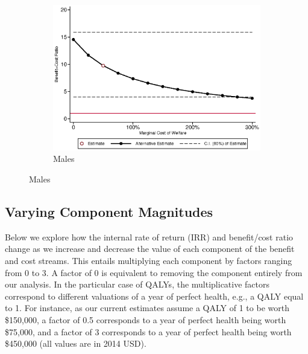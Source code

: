 \begin{figure}[H]
	\begin{subfigure}[h]{0.8\textwidth}
	\centering
	\caption{Males} \label{fig:bcr_dwl_m}
	\includegraphics[width=\textwidth]{AppOutput/Sensitivity/bcr_dwl_m1.eps}
	\end{subfigure}
\end{figure}

\subsection{Varying Component Magnitudes}
\label{app:sa_factors}

\noindent Below we explore how the internal rate of return (IRR) and benefit/cost ratio change as
we increase and decrease the value of each component of the benefit and cost streams. This entails
multiplying each component by factors ranging from 0 to 3. A factor of 0 is equivalent
to removing the component entirely from our analysis. In the particular
case of QALYs, the multiplicative factors correspond to different valuations of a year of perfect
health, e.g., a QALY equal to 1. For instance, as our current estimates assume a QALY of 1 to be worth
\$150,000, a factor of 0.5 corresponds to a year of perfect health being
worth \$75,000, and a factor of 3 corresponds to a year of perfect health
being worth \$450,000 (all values are in 2014 USD). \\

